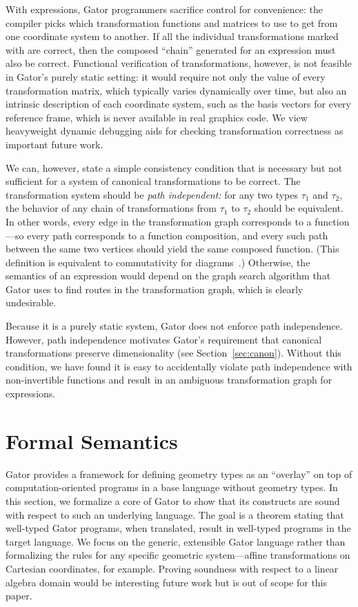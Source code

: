 With  expressions, Gator programmers sacrifice control for convenience:
the compiler picks which transformation functions and matrices to use to get from one coordinate system to another.
%
If all the individual transformations marked with  are correct, then the composed ``chain'' generated for an  expression must also be correct.
%
Functional verification of transformations, however, is not feasible in Gator's purely static setting:
it would require not only the value of every transformation matrix, which typically varies dynamically over time,
but also an intrinsic description of each coordinate system, such as the basis vectors for every reference frame, which is never available in real graphics code.
%
We view heavyweight dynamic debugging aids for checking transformation correctness as important future work.

We can, however, state a simple consistency condition that is necessary but not sufficient for a system of canonical transformations to be correct.
%
The transformation system should be \emph{path independent:}
for any two types $\tau_1$ and $\tau_2$, the behavior of any chain of transformations from $\tau_1$ to $\tau_2$ should be equivalent.
%
In other words, every edge in the transformation graph corresponds to a function---so every path corresponds to a function composition,
and every such path between the same two vertices should yield the same composed function.
%
(This definition is equivalent to commutativity for diagrams~\cite{murota}.)
%
Otherwise, the semantics of an expression  would depend on the graph search algorithm that Gator uses to find routes in the transformation graph, which is clearly undesirable.

Because it is a purely static system, Gator does not enforce path independence.
%
However, path independence motivates Gator's requirement that canonical transformations preserve dimensionality (see Section~\ref{sec:canon}).
%
Without this condition, we have found it is easy to accidentally violate path independence with non-invertible functions and result in an ambiguous transformation graph for  expressions.
\section{Formal Semantics}
\label{sec:semantics}

\newcommand{\targlang}{Hatchling\xspace}

Gator provides a framework for defining geometry types as an ``overlay'' on top of computation-oriented programs in a base language without geometry types.
In this section, we formalize a core of Gator to show that its constructs are sound with respect to such an underlying language.
The goal is a theorem stating that well-typed Gator programs, when translated, result in well-typed programs in the target language.
We focus on the generic, extensible Gator language rather than formalizing the rules for any specific geometric system---affine transformations on Cartesian coordinates, for example.
Proving soundness with respect to a linear algebra domain would be interesting future work but is out of scope for this paper.

